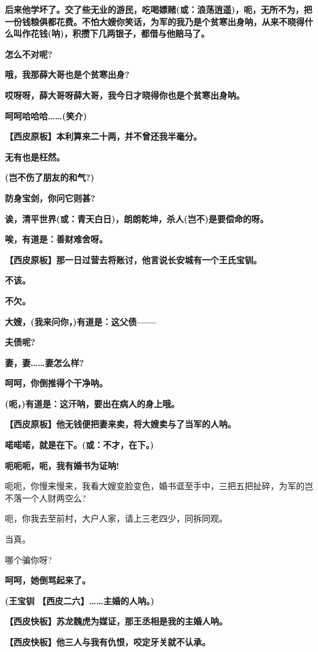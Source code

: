 \textbf{后来他学坏了。交了些无业的游民，吃喝嫖赌(或：浪荡逍遥)，呃，无所不为，把一份钱粮俱都花费。不怕大嫂你笑话，为军的我乃是个贫寒出身呐，从来不晓得什么叫作花钱(呐)，积攒下几两银子，都借与他赔马了。}

\textbf{怎么不对呢?}

\textbf{哦，我那薛大哥也是个贫寒出身?}

\textbf{哎呀呀，薛大哥呀薛大哥，我今日才晓得你也是个贫寒出身呐。}

\textbf{呵呵哈哈哈\ldots{}\ldots{}(笑介)}

\textbf{【西皮原板】本利算来二十两，并不曾还我半毫分。}

\textbf{无有也是枉然。}

\textbf{(岂不伤了朋友的和气?)}

\textbf{防身宝剑，你问它则甚?}

\textbf{诶，清平世界(或：青天白日)，朗朗乾坤，杀人(岂不)是要偿命的呀。}

\textbf{唉，有道是：善财难舍呀。}

\textbf{【西皮原板】那一日过营去将账讨，他言说长安城有一个王氏宝钏。}

\textbf{不该。}

\textbf{不欠。}

\textbf{大嫂，(我来问你，)有道是：这父债------}

\textbf{夫债呢?}

\textbf{妻，妻\ldots{}\ldots{}妻怎么样?}

\textbf{呵呵，你倒推得个干净呐。}

\textbf{(呃，)有道是：这汗呐，要出在病人的身上哦。}

\textbf{【西皮原板】他无钱便把妻来卖，将大嫂卖与了当军的人呐。}

\textbf{喏喏喏，就是在下。(或：不才，在下。)}

\textbf{呃呃呃，呃，我有婚书为证呐!}

呃呃，你慢来慢来，我看大嫂变脸变色，婚书诓至手中，三把五把扯碎，为军的岂不落一个人财两空么?

呃，你我去至前村，大户人家，请上三老四少，同拆同观。

当真。

哪个骗你呀?

\textbf{呵呵，她倒骂起来了。}

\textbf{(王宝钏 【西皮二六】\ldots{}\ldots{}主婚的人呐。)}

\textbf{【西皮快板】苏龙魏虎为媒证，那王丞相是我的主婚人呐。}

\textbf{【西皮快板】他三人与我有仇恨，咬定牙关就不认承。}

